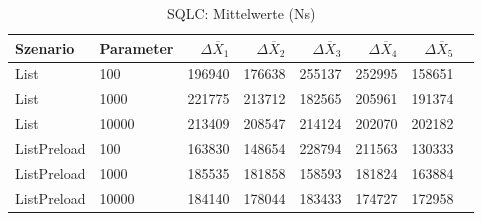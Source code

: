 
\begin{table}[ht]
\setlength{\extrarowheight}{-1pt}
\centering
\caption{SQLC: Mittelwerte (Ns)}
\begin{tabular}{llrrrrrr}
\toprule
Szenario & Parameter & ${\Delta \overline{X}_1}$ & ${\Delta \overline{X}_2}$ & ${\Delta \overline{X}_3}$ & ${\Delta \overline{X}_4}$ & ${\Delta \overline{X}_5}$ \\
\midrule
	List & 100 & 196940 & 176638 & 255137 & 252995 & 158651 \\
	List & 1000 & 221775 & 213712 & 182565 & 205961 & 191374 \\
	List & 10000 & 213409 & 208547 & 214124 & 202070 & 202182 \\
	ListPreload & 100 & 163830 & 148654 & 228794 & 211563 & 130333 \\
	ListPreload & 1000 & 185535 & 181858 & 158593 & 181824 & 163884 \\
	ListPreload & 10000 & 184140 & 178044 & 183433 & 174727 & 172958 \\
\bottomrule
\end{tabular}
\label{tab:mittelwerte_sqlc_ns}
\end{table}
	